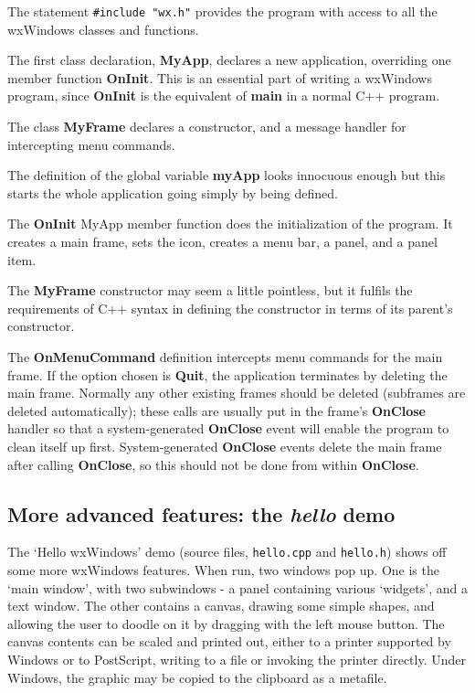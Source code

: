 %

The statement {\tt \#include "wx.h"} provides the program with access to
all the wxWindows classes and functions.

The first class declaration, {\bf MyApp}, declares a new application,
overriding one member function {\bf OnInit}. This is an essential part
of writing a wxWindows program, since {\bf OnInit} is the equivalent of
{\bf main} in a normal C++ program.

The class {\bf MyFrame} declares a constructor, and a message handler
for intercepting menu commands.

The definition of the global variable {\bf myApp} looks innocuous enough
but this starts the whole application going simply by being defined.

The {\bf OnInit} MyApp member function does the initialization of
the program. It creates a main frame, sets the icon,
creates a menu bar, a panel, and a panel item.

The {\bf MyFrame} constructor may seem a little pointless, but it
fulfils the requirements of C++ syntax in defining the constructor in
terms of its parent's constructor.

The {\bf OnMenuCommand} definition intercepts menu commands for the main
frame. If the option chosen is {\bf Quit}, the application terminates by
deleting the main frame. Normally any other existing frames should be
deleted (subframes are deleted automatically); these calls are usually put
in the frame's {\bf OnClose} handler so that a system-generated {\bf
OnClose} event will enable the program to clean itself up first.
System-generated {\bf OnClose} events delete the main frame after calling
{\bf OnClose}, so this should not be done from within {\bf OnClose}.

\subsection{More advanced features: the {\it hello} demo}

The `Hello wxWindows' demo (source files, {\tt hello.cpp} and {\tt hello.h})
shows off some more wxWindows features.  When run, two windows pop up.
One is the `main window', with two subwindows - a panel containing
various `widgets', and a text window.  The other contains a canvas,
drawing some simple shapes, and allowing the user to doodle on it by
dragging with the left mouse button.  The canvas contents can be
scaled and printed out, either to a printer supported by Windows or to
PostScript, writing to a file or invoking the printer directly. Under
Windows, the graphic may be copied to the clipboard as a metafile.


